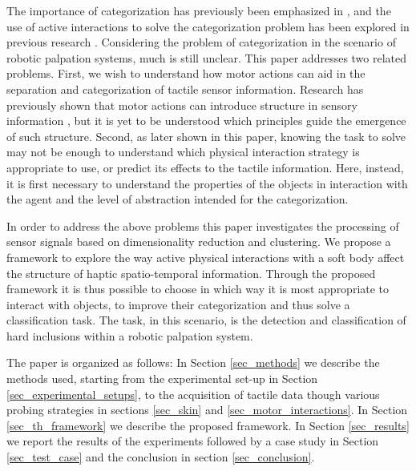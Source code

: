 {\begin{figure}[]
\end{figure}
The importance of categorization has previously been emphasized in \cite{hoffmann2012implications}, and the use of active 
interactions to solve the categorization problem has been explored in previous research 
\cite{pfeifer1997, nolfi2002active, tuci2009dynamics}.
Considering the problem of categorization in the scenario of robotic palpation systems, much is still unclear. 
This paper addresses two related problems. First, we wish to understand how motor actions can aid in the separation and categorization of tactile sensor information. Research has previously shown that motor actions can introduce structure in sensory information \cite{lungarella2005methods, sporns2006evolving, pfeifer2007information}, but it is yet to be understood 
which principles guide the emergence of such structure. Second, as later shown in this paper, knowing the task to solve may not be enough to understand which physical interaction strategy is appropriate to use, or predict its effects to the tactile information. Here, instead, it is first necessary to understand the properties of the objects in interaction with the agent and the level of abstraction intended for the categorization.

In order to address the above problems this paper investigates the processing of sensor signals based on dimensionality 
reduction and clustering. We propose a framework to explore the way active physical interactions with a soft body affect the structure of haptic spatio-temporal information. Through the proposed framework it is thus possible to choose in which way it is most appropriate to interact with objects, to improve their categorization and thus solve a classification task. The task, in this scenario, is the detection and classification of hard inclusions within a robotic palpation system.

The paper is organized as follows: In Section \ref{sec_methods} we describe the methods used, starting from the experimental 
set-up in Section \ref{sec_experimental_setups}, to the acquisition of tactile data though various probing strategies in sections \ref{sec_skin} and \ref{sec_motor_interactions}. In Section \ref{sec_th_framework} we describe the proposed framework. In Section \ref{sec_results} we report the results of the experiments followed by a case study in Section \ref{sec_test_case} and the conclusion in section  \ref{sec_conclusion}. } \color{black}




